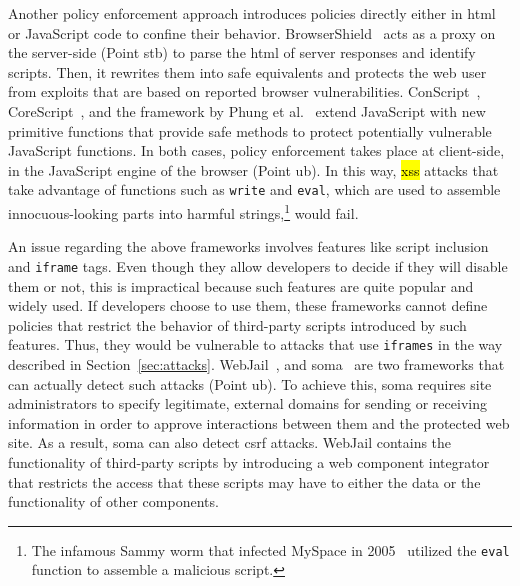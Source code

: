 \documentclass[10pt,journal,compsoc]{IEEEtran}
\newcommand{\hlc}[2][yellow]{ {\sethlcolor{#1} \hl{#2}} }
\begin{document}
Another policy enforcement approach introduces
policies directly either in {\sc html} or JavaScript code
to confine their behavior. BrowserShield~\cite{RDWDE07}
acts as a proxy on the server-side (Point {\sc s}t{\sc b}) to
parse the {\sc html} of server responses and identify
scripts. Then, it rewrites them into safe equivalents
and protects the web user from exploits
that are based on reported browser vulnerabilities.
ConScript~\cite{ML10}, CoreScript~\cite{YCIS07},
and the framework by Phung et al.~\cite{PSC09}
extend JavaScript with new primitive functions that
provide safe methods to protect potentially vulnerable
JavaScript functions. In both cases, policy enforcement takes
place at client-side, in the JavaScript engine of the browser (Point {\sc ub}).
In this way, \hlc[yellow]{{\sc xss}} attacks that take advantage
of functions such as {\tt write} and {\tt eval}, which are
used to assemble innocuous-looking parts into harmful
strings,\footnote{\scriptsize The infamous Sammy worm that
infected MySpace in 2005~\cite{ELX07}
utilized the {\tt eval} function to assemble a
malicious script.} would fail.

An issue regarding the above frameworks
involves features like script inclusion
and {\tt iframe} tags. Even though they allow developers
to decide if they will disable them or not,
this is impractical because such features are quite popular and widely used.
If developers choose to use them, these frameworks cannot
define policies that restrict the behavior of third-party
scripts introduced by such features. Thus, they would
be vulnerable to attacks that use {\tt iframes}
in the way described in Section~\ref{sec:attacks}.
WebJail~\cite{VDDPJ11}, and {\sc soma}~\cite{OWVS08}
are two frameworks that can actually detect such attacks (Point {\sc
  ub}). To achieve this, {\sc soma} requires site administrators to
specify legitimate, external domains for sending or receiving
information in order to approve interactions between them and the
protected web site. As a result, {\sc soma} can also detect {\sc csrf}
attacks. WebJail contains the functionality of third-party scripts by
introducing a web component integrator that restricts the access that
these scripts may have to either the data or the functionality of
other components.
\end{document}
